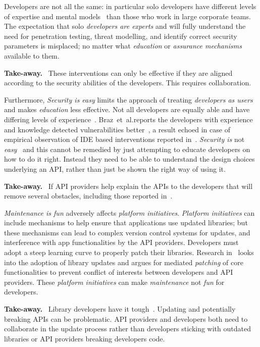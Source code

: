 \documentclass[conference]{IEEEtran}
\newenvironment{finding}{\begin{framed}\noindent\textbf{Take-away.}~}{\end{framed}}
\newcommand{\etal}[0]{et~al{.}}
\begin{document}
Developers are not all the same: in particular 
solo developers have different levels of expertise and mental models~\cite{acarusability2017,joseph2021} than those who work in large corporate teams. The expectation that solo \emph{developers are experts} and will fully understand the need for penetration testing, threat modelling, and identify correct security parameters is misplaced; no matter what \emph{education} or \emph{assurance mechanisms} available to them.
\begin{finding}\noindent 
These interventions can only be effective if they are aligned according to the security abilities of the developers. This requires collaboration. 
\end{finding}


Furthermore,
\emph{Security is easy} limits the approach of treating \emph{developers as users} and makes \emph{education} less effective. Not all developers are equally able and have differing levels of experience~\cite{zhuaside2013,braz2021}. Braz~\etal reports the developers with experience and knowledge detected vulnerabilities better~\cite{braz2021}, a result echoed in case of empirical observation of IDE based interventions reported in~\cite{aside2012}. \emph{Security is} not \emph{easy}~\cite{oltrogge2018rise} and this cannot be remedied by just attempting to educate developers on how to do it right. Instead they need to be able to understand the design choices underlying an API, rather than just be shown the right way of using it.
\begin{finding}
\noindent  
If API providers help explain the APIs to the developers that will remove several obstacles, including those reported in~\cite{nadijava2016,acar2016infosources}.  
\end{finding}

\emph{Maintenance is fun} adversely affects \emph{platform initiatives}. \emph{Platform initiatives} can include mechanisms to help ensure that applications use updated libraries; but these mechanisms can lead to complex version control systems for updates, and interference with app functionalities by the API providers. Developers must adopt a steep learning curve to properly patch their libraries. Research in~\cite{erikacar2017} looks into the adoption of library updates and argues for mediated \emph{patching} of core functionalities to prevent conflict of interests between developers and API providers. These \emph{platform initiatives} can make \emph{maintenance} not \emph{fun} for developers.
\begin{finding}
\noindent
Library developers have it tough~\cite{hartman2021nontechnical}. 
Updating and potentially breaking APIs can be problematic.
API providers and developers both need to collaborate in the update process rather than developers sticking with outdated libraries or API providers breaking developers code.  
\end{finding}
\end{document}
